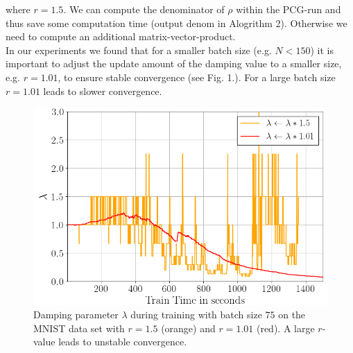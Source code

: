 \documentclass[conference]{IEEEtran}
\begin{document}
	where $r=1.5$. We can compute the denominator of $\rho$ within the PCG-run and thus save some computation time (output denom in Alogrithm 2). Otherwise we need to compute an additional matrix-vector-product.\\
	In our experiments we found that for a smaller batch size (e.g. $N<150$) it is important to adjust the update amount of the damping value to a smaller size, e.g. $r=1.01$, to ensure stable convergence (see Fig. 1.). For a large batch size $r=1.01$ leads to slower convergence.

	\begin{figure}[htbp]
		\centerline{\includegraphics[scale=0.52]{lambda.png}}
		\caption{Damping parameter $\lambda$ during training with batch size $75$ on the MNIST data set with $r=1.5$ (orange) and $r=1.01$ (red). A large $r$-value leads to unstable convergence.}
		\label{fig1}
	\end{figure}
\end{document}
